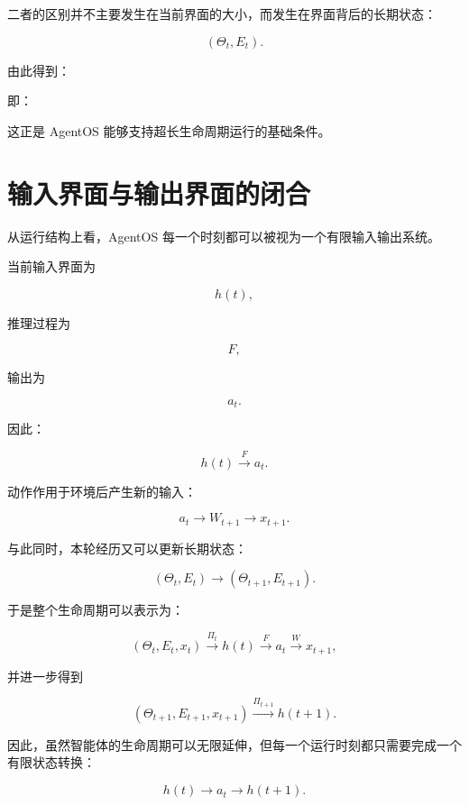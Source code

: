 二者的区别并不主要发生在当前界面的大小，而发生在界面背后的长期状态：

\[
(\Theta_t,E_t).
\]

由此得到：

\begin{statementbox}
\centering
{}
\end{statementbox}

即：

\begin{statementbox}
\centering
{}
\end{statementbox}

这正是 AgentOS 能够支持超长生命周期运行的基础条件。


\section{输入界面与输出界面的闭合}

从运行结构上看，AgentOS 每一个时刻都可以被视为一个有限输入输出系统。

当前输入界面为

\[
h(t),
\]

推理过程为

\[
F,
\]

输出为

\[
a_t.
\]

因此：

\[
h(t)
\xrightarrow{F}
a_t.
\]

动作作用于环境后产生新的输入：

\[
a_t
\rightarrow
W_{t+1}
\rightarrow
x_{t+1}.
\]

与此同时，本轮经历又可以更新长期状态：

\[
(\Theta_t,E_t)
\rightarrow
(\Theta_{t+1},E_{t+1}).
\]

于是整个生命周期可以表示为：

\[
(\Theta_t,E_t,x_t)
\xrightarrow{\Pi_t}
h(t)
\xrightarrow{F}
a_t
\xrightarrow{W}
x_{t+1},
\]

并进一步得到

\[
(\Theta_{t+1},E_{t+1},x_{t+1})
\xrightarrow{\Pi_{t+1}}
h(t+1).
\]

因此，虽然智能体的生命周期可以无限延伸，但每一个运行时刻都只需要完成一个有限状态转换：

\[
\boxed{
h(t)
\rightarrow
a_t
\rightarrow
h(t+1).
}
\]

